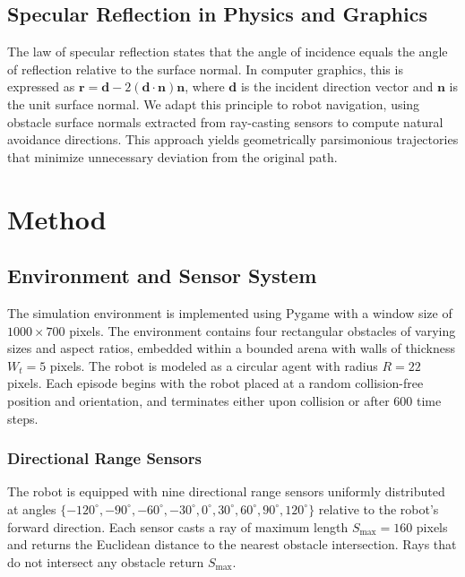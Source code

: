 \documentclass[conference]{IEEEtran}
\begin{document}
\subsection{Specular Reflection in Physics and Graphics}

The law of specular reflection states that the angle of incidence equals the angle of reflection relative to the surface normal. In computer graphics, this is expressed as $\mathbf{r} = \mathbf{d} - 2(\mathbf{d} \cdot \mathbf{n})\mathbf{n}$, where $\mathbf{d}$ is the incident direction vector and $\mathbf{n}$ is the unit surface normal. We adapt this principle to robot navigation, using obstacle surface normals extracted from ray-casting sensors to compute natural avoidance directions. This approach yields geometrically parsimonious trajectories that minimize unnecessary deviation from the original path.

\section{Method}

\subsection{Environment and Sensor System}

The simulation environment is implemented using Pygame with a window size of $1000 \times 700$ pixels. The environment contains four rectangular obstacles of varying sizes and aspect ratios, embedded within a bounded arena with walls of thickness $W_t = 5$ pixels. The robot is modeled as a circular agent with radius $R = 22$ pixels. Each episode begins with the robot placed at a random collision-free position and orientation, and terminates either upon collision or after 600 time steps.

\subsubsection{Directional Range Sensors}

The robot is equipped with nine directional range sensors uniformly distributed at angles $\{-120^\circ, -90^\circ, -60^\circ, -30^\circ, 0^\circ, 30^\circ, 60^\circ, 90^\circ, 120^\circ\}$ relative to the robot's forward direction. Each sensor casts a ray of maximum length $S_{\text{max}} = 160$ pixels and returns the Euclidean distance to the nearest obstacle intersection. Rays that do not intersect any obstacle return $S_{\text{max}}$.
\end{document}

